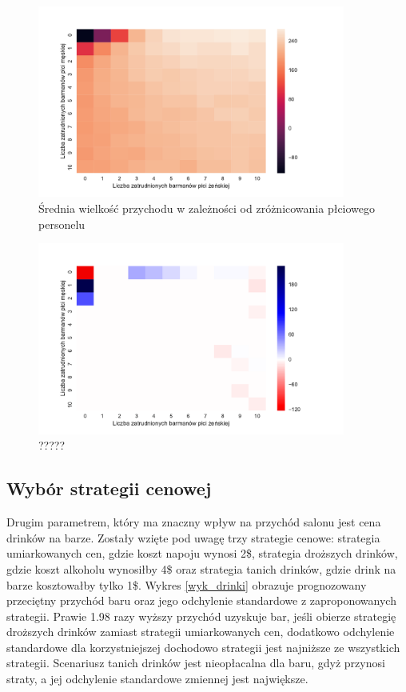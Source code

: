 \documentclass[12pt, a4paper, oneside]{mwart} %
\begin{document}
\begin{figure}
\centering
\caption{Średnia wielkość przychodu w zależności od zróżnicowania płciowego personelu}
\label{wyk_barmani}
\includegraphics[width = 0.9\textwidth]{wykresy/barmani.pdf}
\end{figure}

\begin{figure}
\centering
\caption{?????}
\label{wyk_opt_sciezka}
\includegraphics[width = 0.9\textwidth]{wykresy/opt_sciezka.pdf}
\end{figure}

\subsection{Wybór strategii cenowej}
Drugim parametrem, który ma znaczny wpływ na przychód salonu jest cena drinków na barze. Zostały wzięte pod uwagę trzy strategie cenowe: strategia umiarkowanych cen, gdzie koszt napoju wynosi 2\$, strategia droższych drinków, gdzie koszt alkoholu wynosiłby 4\$ oraz strategia tanich drinków, gdzie drink na barze kosztowałby tylko 1\$. Wykres \ref{wyk_drinki} obrazuje prognozowany przeciętny przychód baru oraz jego odchylenie standardowe z zaproponowanych strategii. Prawie 1.98 razy wyższy przychód uzyskuje bar, jeśli obierze strategię droższych drinków zamiast strategii umiarkowanych cen, dodatkowo odchylenie standardowe dla korzystniejszej dochodowo strategii jest najniższe ze wszystkich strategii. Scenariusz tanich drinków jest nieopłacalna dla baru, gdyż przynosi straty, a jej odchylenie standardowe zmiennej jest największe.
\end{document}
